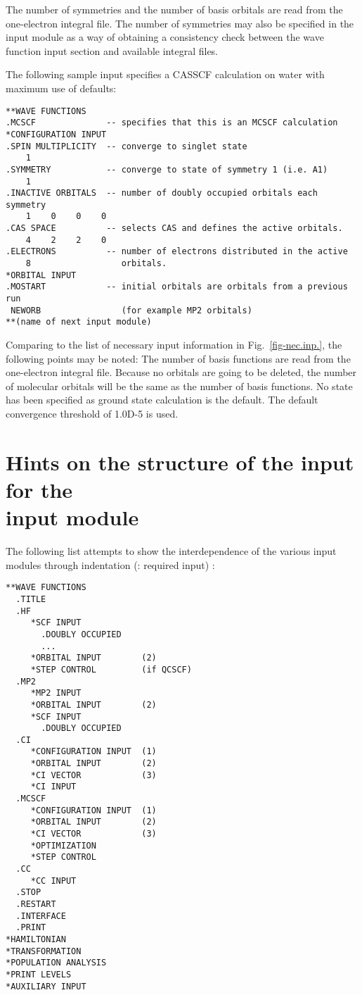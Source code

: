 \noindent
The number of symmetries and the number of basis orbitals are read from
the one-electron integral file.  The number of symmetries may also be
specified in the  input module as a way of
obtaining a consistency check between the wave function input section
and available integral files.

\noindent
The following sample input specifies a CASSCF
calculation on water with maximum use of defaults:

\begin{verbatim}
**WAVE FUNCTIONS
.MCSCF              -- specifies that this is an MCSCF calculation
*CONFIGURATION INPUT
.SPIN MULTIPLICITY  -- converge to singlet state
    1
.SYMMETRY           -- converge to state of symmetry 1 (i.e. A1)
    1
.INACTIVE ORBITALS  -- number of doubly occupied orbitals each symmetry
    1    0    0    0
.CAS SPACE          -- selects CAS and defines the active orbitals.
    4    2    2    0
.ELECTRONS          -- number of electrons distributed in the active
    8                  orbitals.
*ORBITAL INPUT
.MOSTART            -- initial orbitals are orbitals from a previous run
 NEWORB                (for example MP2 orbitals)
**(name of next input module)
\end{verbatim}

\noindent
Comparing to the list of necessary input information in
Fig.~\ref{fig-nec.inp.},
the following points may be noted:
\noindent
The number of basis functions are read from the one-electron integral
file. Because no orbitals are going to be deleted, the number of
molecular orbitals will be the same as the number of basis functions.
\noindent
No state has been specified as ground state calculation is the default.
\noindent
The default convergence threshold of
1.0D-5 is used.


\clearpage
\section{\label{sec:ig_hints} Hints on the structure of the input for
the \\ input module}


The following list attempts to show the interdependence of the various
input modules through indentation
(: required input) :

\begin{verbatim}
**WAVE FUNCTIONS
  .TITLE
  .HF
     *SCF INPUT
       .DOUBLY OCCUPIED
       ...
     *ORBITAL INPUT        (2)
     *STEP CONTROL         (if QCSCF)
  .MP2
     *MP2 INPUT
     *ORBITAL INPUT        (2)
     *SCF INPUT
       .DOUBLY OCCUPIED
  .CI
     *CONFIGURATION INPUT  (1)
     *ORBITAL INPUT        (2)
     *CI VECTOR            (3)
     *CI INPUT
  .MCSCF
     *CONFIGURATION INPUT  (1)
     *ORBITAL INPUT        (2)
     *CI VECTOR            (3)
     *OPTIMIZATION
     *STEP CONTROL
  .CC
     *CC INPUT
  .STOP
  .RESTART
  .INTERFACE
  .PRINT
*HAMILTONIAN
*TRANSFORMATION
*POPULATION ANALYSIS
*PRINT LEVELS
*AUXILIARY INPUT
\end{verbatim}

